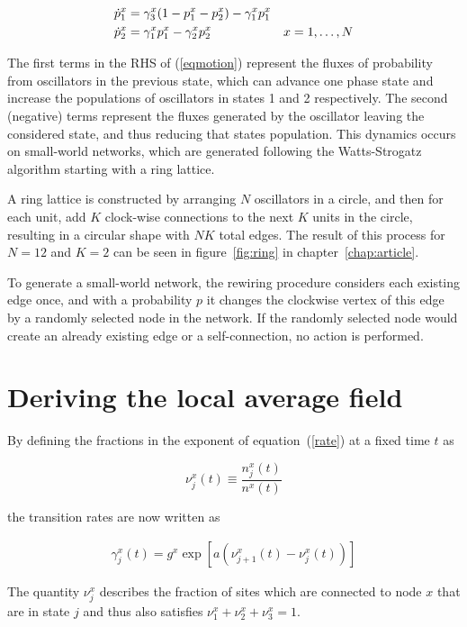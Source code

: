 \begin{align}
    \dot{p}^x_1 &= \gamma^x_3(1 - p^x_1 - p^x_2) - \gamma^x_1 p^x_1 & \notag\\
    \dot{p}^x_2 &= \gamma^x_1p^x_1 - \gamma^x_2 p^x_2 &x=1,\dots,N
    \label{eqmotion}
\end{align}

\noindent The first terms in the RHS of (\ref{eqmotion}) represent the fluxes of probability from oscillators in the previous state,
which can advance one phase state and increase the populations of oscillators in states 1 and 2 respectively. The second (negative)
terms represent the fluxes generated by the oscillator leaving the considered state, and thus reducing that states population.  This
dynamics occurs on small-world networks, which are generated following the Watts-Strogatz algorithm starting with a ring lattice.

A ring lattice is constructed by arranging $N$ oscillators in a circle, and then for each unit, add $K$ clock-wise connections to the
next $K$ units in the circle, resulting in a circular shape with $NK$ total edges. The result of this process for $N=12$ and $K=2$ can
be seen in figure~\ref{fig:ring} in chapter~\ref{chap:article}.

To generate a small-world network, the rewiring procedure considers each existing edge once, and with a probability $p$ it changes the
clockwise vertex of this edge by a randomly selected node in the network. If the randomly selected node would create an already
existing edge or a self-connection, no action is performed.

\section{Deriving the local average field}

By defining the fractions in the exponent of equation~(\ref{rate}) at a fixed time $t$ as

\begin{equation}
    \nu^x_j(t) \equiv \frac{n^x_j(t)}{n^x(t)}
\end{equation}

\noindent the transition rates are now written as

\begin{align}
    \gamma^x_j(t) = g^x\exp\left[ a(\nu^x_{j+1}(t) - \nu^x_j(t)) \right]
    \label{mfrate}
\end{align}

The quantity $\nu^x_j$
describes the fraction of sites which are connected to node $x$ that are in state $j$ and thus also satisfies
$\nu^x_1+\nu^x_2+\nu^x_3=1$.

